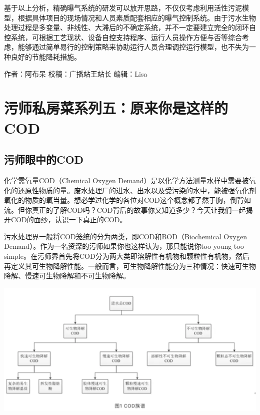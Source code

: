 \documentclass[
]{book}
\begin{document}
基于以上分析，精确曝气系统的研发可以放开思路，不仅仅考虑利用活性污泥模型，根据具体项目的现场情况和人员素质配套相应的曝气控制系统。由于污水生物处理过程是多变量、非线性、大滞后的不确定系统，并不一定要建立完全的闭环自控系统，可根据工艺现状、设备自控支持程序、运行人员操作方便与否等综合考虑，能够通过简单易行的控制策略来协助运行人员合理调控运行模型，也不失为一种良好的节能降耗措施。

作者：阿布呆
校稿：广播站王站长
编辑：Lisa

\hypertarget{ux6c61ux5e08ux79c1ux623fux83dcux7cfbux5217ux4e94ux539fux6765ux4f60ux662fux8fd9ux6837ux7684cod}{%
\section{污师私房菜系列五：原来你是这样的COD}\label{ux6c61ux5e08ux79c1ux623fux83dcux7cfbux5217ux4e94ux539fux6765ux4f60ux662fux8fd9ux6837ux7684cod}}

\hypertarget{ux6c61ux5e08ux773cux4e2dux7684cod}{%
\subsection{污师眼中的COD}\label{ux6c61ux5e08ux773cux4e2dux7684cod}}

化学需氧量COD（Chemical Oxygen Demand）是以化学方法测量水样中需要被氧化的还原性物质的量。废水处理厂的进水、出水以及受污染的水中，能被强氧化剂氧化的物质的氧当量。想必学过化学的各位对COD这个概念都了然于胸，倒背如流。但你真正的了解COD吗？COD背后的故事你又知道多少？今天让我们一起揭开COD的面纱，认识一下真正的COD。

污水处理界一般将COD笼统的分为两类，即COD和BOD（Biochemical Oxygen Demand）。作为一名资深的污师如果你也这样认为，那只能说你too young too simple。在污师界首先将COD分为两大类即溶解性有机物和颗粒性有机物，然后再定义其可生物降解性能。一般而言，可生物降解性能分为三种情况：快速可生物降解、慢速可生物降解和不可生物降解。

\includegraphics[width=6.67in]{images/cod1}
\end{document}
